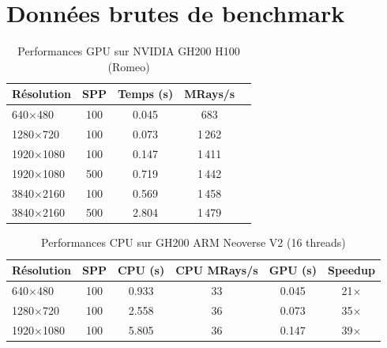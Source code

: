 \documentclass[12pt,a4paper]{article}
\begin{document}
\appendix
\section{Données brutes de benchmark}

\begin{table}[H]
\centering
\caption{Performances GPU sur NVIDIA GH200 H100 (Romeo)}
\begin{tabular}{lcccc}
\toprule
\textbf{Résolution} & \textbf{SPP} & \textbf{Temps (s)} & \textbf{MRays/s} \\
\midrule
640$\times$480 & 100 & 0.045 & 683 \\
1280$\times$720 & 100 & 0.073 & 1\,262 \\
1920$\times$1080 & 100 & 0.147 & 1\,411 \\
1920$\times$1080 & 500 & 0.719 & 1\,442 \\
3840$\times$2160 & 100 & 0.569 & 1\,458 \\
3840$\times$2160 & 500 & 2.804 & 1\,479 \\
\bottomrule
\end{tabular}
\label{tab:benchmarks_romeo_gpu}
\end{table}

\begin{table}[H]
\centering
\caption{Performances CPU sur GH200 ARM Neoverse V2 (16 threads)}
\begin{tabular}{lccccc}
\toprule
\textbf{Résolution} & \textbf{SPP} & \textbf{CPU (s)} & \textbf{CPU MRays/s} & \textbf{GPU (s)} & \textbf{Speedup} \\
\midrule
640$\times$480 & 100 & 0.933 & 33 & 0.045 & 21$\times$ \\
1280$\times$720 & 100 & 2.558 & 36 & 0.073 & 35$\times$ \\
1920$\times$1080 & 100 & 5.805 & 36 & 0.147 & 39$\times$ \\
\bottomrule
\end{tabular}
\label{tab:benchmarks_romeo_cpu}
\end{table}
\end{document}
